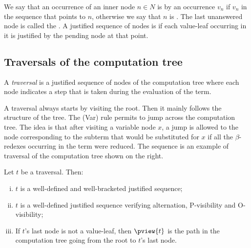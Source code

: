We say that an occurrence of an inner node $n \in N$ is
 by an occurrence $v_n$ if $v_n$ in
the sequence that points to $n$, otherwise we say that $n$ is
. The last unanswered node is called the
.  A justified sequence of nodes is
 if each value-leaf occurring in it is justified by the pending node at that point.

\subsection{Traversals of the computation tree}
\label{subsec:traversal}

A \emph{traversal} is a justified sequence of nodes of the computation tree where each node indicates a step that is taken during the evaluation of the term.



 A traversal always starts by visiting the root. Then it mainly follows the structure of the tree. The (Var) rule permits to jump across the computation tree. The idea is that after visiting a variable node $x$, a jump is allowed to the node corresponding to the subterm that would be substituted for $x$ if all the $\beta$-redexes occurring in the term were reduced. The sequence 
 is an example of traversal of the computation tree shown on the right.

\begin{proposition}
\label{prop:pviewtrav_is_path} Let $t$ be a traversal. Then:
\begin{enumerate}[(i)]
\item $t$ is a well-defined and well-bracketed justified sequence;
\item $t$ is a well-defined justified sequence verifying alternation, P-visibility and O-visibility;
\item If $t$'s last node is not a value-leaf, then $\pview{t}$ is the path in the computation tree going from the root to $t$'s last node.
\end{enumerate}
\end{proposition}

